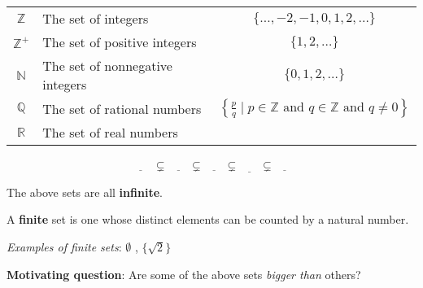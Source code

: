 
\begin{tabular}{clc}
    $\mathbb{Z}$ &  The  set of integers  & $\{ \ldots, -2, -1, 0,  1, 2, \ldots\}$ \\
    $\mathbb{Z}^+$ &  The  set of positive integers  & $\{1, 2, \ldots\}$ \\
    $\mathbb{N}$ &  The  set of nonnegative integers  & $\{0, 1, 2, \ldots\}$ \\
    $\mathbb{Q}$ &  The  set of rational numbers  & $\left\{ \frac{p}{q} \mid p \in \mathbb{Z}  \text{ and  } q  \in \mathbb{Z} \text{ and } q \neq  0 \right\}$\\
    $\mathbb{R}$ & The  set  of  real numbers &  \\
    \end{tabular}
    \[
    \underline{\phantom{\mathbb{Z}^+}} ~~\subsetneq~~ \underline{\phantom{\mathbb{N}~}} ~~\subsetneq ~~\underline{\phantom{\mathbb{Z}~}}~~ \subsetneq~~ \underline{\phantom{\mathbb{Q}~}} 
    ~~\subsetneq~~ \underline{\phantom{\mathbb{R}~}} 
    \]
    
    
    The above sets are all {\bf infinite}.
    
    
    A {\bf finite} set is one whose distinct elements can be counted by a natural number.
    
    {\it Examples of finite sets}: $\emptyset$ , $\{ \sqrt{2} \}$
    
    
    {\bf Motivating question}: Are some of the above sets {\it bigger than} others?